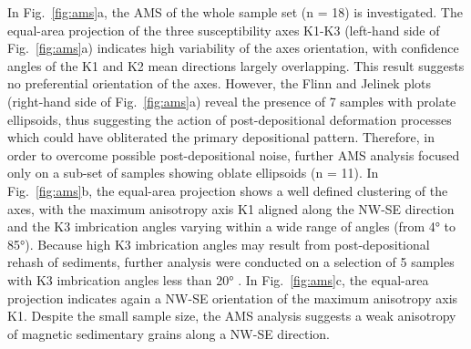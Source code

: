 \documentclass[5p,times,authoryear]{elsarticle}
\begin{document}
In Fig.~\ref{fig:ams}a, the AMS of the whole sample set (n = 18) is investigated. The equal-area projection of the three susceptibility axes K1-K3 (left-hand side of Fig.~\ref{fig:ams}a) indicates high variability of the axes orientation, with confidence angles of the K1 and K2 mean directions largely overlapping. This result suggests no preferential orientation of the axes. However, the Flinn and Jelinek plots (right-hand side of Fig.~\ref{fig:ams}a) reveal the presence of 7 samples with prolate ellipsoids, thus suggesting the action of post-depositional deformation processes which could have obliterated the primary depositional pattern. Therefore, in order to overcome possible post-depositional noise, further AMS analysis focused only on a sub-set of samples showing oblate ellipsoids (n = 11). In Fig.~\ref{fig:ams}b, the equal-area projection shows a well defined clustering of the axes, with the maximum anisotropy axis K1 aligned along the NW-SE direction and the K3 imbrication angles varying within a wide range of angles (from 4° to 85°). Because high K3 imbrication angles may result from post-depositional rehash of sediments, further analysis were conducted on a selection of 5 samples with K3 imbrication angles less than 20° \citep{Hamilton1970,Hrouda1982,Tarling1993,Liu2001,Lanza2006}. In Fig.~\ref{fig:ams}c, the equal-area projection indicates again a NW-SE orientation of the maximum anisotropy axis K1. Despite the small sample size, the AMS analysis suggests a weak anisotropy of magnetic sedimentary grains along a NW-SE direction.
\end{document}
